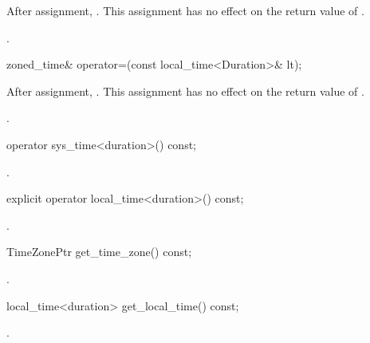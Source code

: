\begin{itemdescr}
\pnum
\effects
After assignment, .
This assignment has no effect on the return value of .

\pnum
\returns
{}.
\end{itemdescr}

%
\begin{itemdecl}
zoned_time& operator=(const local_time<Duration>& lt);
\end{itemdecl}

\begin{itemdescr}
\pnum
\effects
After assignment, .
This assignment has no effect on the return value of .

\pnum
\returns
{}.
\end{itemdescr}

%
\begin{itemdecl}
operator sys_time<duration>() const;
\end{itemdecl}

\begin{itemdescr}
\pnum
\returns
{}.
\end{itemdescr}

%
\begin{itemdecl}
explicit operator local_time<duration>() const;
\end{itemdecl}

\begin{itemdescr}
\pnum
\returns
{}.
\end{itemdescr}

%
\begin{itemdecl}
TimeZonePtr get_time_zone() const;
\end{itemdecl}

\begin{itemdescr}
\pnum
\returns
{}.
\end{itemdescr}

%
\begin{itemdecl}
local_time<duration> get_local_time() const;
\end{itemdecl}

\begin{itemdescr}
\pnum
\returns
{}.
\end{itemdescr}

